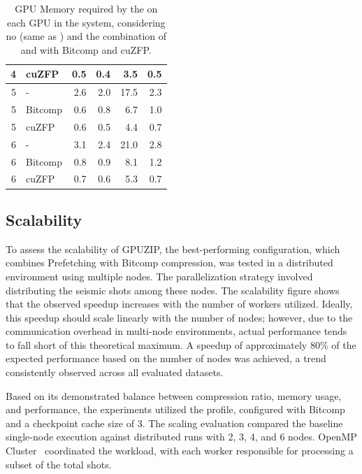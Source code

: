 \documentclass[Ingles]{ic-tese-v3}
\begin{document}
\begin{table}[h!]
\begin{tabular}{|r|l|r|r|r|r|}
\rowcolor[HTML]{EFEFEF} 
4 & cuZFP   & 0.5 & 0.4 & 3.5  & 0.5 \\ \hline
5 & -       & 2.6 & 2.0 & 17.5 & 2.3 \\ \hline
5 & Bitcomp & 0.6 & 0.8 & 6.7  & 1.0 \\ \hline
5 & cuZFP   & 0.6 & 0.5 & 4.4  & 0.7 \\ \hline
\rowcolor[HTML]{EFEFEF} 
6 & -       & 3.1 & 2.4 & 21.0 & 2.8 \\ \hline
\rowcolor[HTML]{EFEFEF} 
6 & Bitcomp & 0.8 & 0.9 & 8.1  & 1.2 \\ \hline
\rowcolor[HTML]{EFEFEF} 
6 & cuZFP   & 0.7 & 0.6 & 5.3  & 0.7 \\ \hline
\end{tabular}
\caption[Memory consumption analysis (\checkpointprefetching + \compression)]{GPU Memory required by the \cache on each GPU in the system, considering no \compression (same as ) and the combination of \checkpointprefetching and \compression with Bitcomp and cuZFP.}
\label{tab:prefcomp_mem}
\end{table}


\subsection{Scalability}
\label{sec:comppref_scalability}

To assess the scalability of GPUZIP, the best-performing configuration, which combines Prefetching with Bitcomp compression, was tested in a distributed environment using multiple nodes. The parallelization strategy involved distributing the seismic shots among these nodes. The scalability figure shows that the observed speedup increases with the number of workers utilized. Ideally, this speedup should scale linearly with the number of nodes; however, due to the communication overhead in multi-node environments, actual performance tends to fall short of this theoretical maximum. A speedup of approximately 80\% of the expected performance based on the number of nodes was achieved, a trend consistently observed across all evaluated datasets.

Based on its demonstrated balance between compression ratio, memory usage, and performance, the experiments utilized the \revolve profile, configured with Bitcomp and a checkpoint cache size of 3. The scaling evaluation compared the baseline single-node execution against distributed runs with 2, 3, 4, and 6 nodes. OpenMP Cluster~\cite{ompc} coordinated the workload, with each worker responsible for processing a subset of the total shots.
\end{document}
